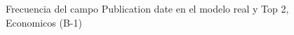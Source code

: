 \begin{figure}[H]
    \centering
    
    \caption{Frecuencia del campo Publication date en el modelo real y Top 2, Economicos (B-1)}
    \label{frecuency-Publication Date-top2}
\end{figure}